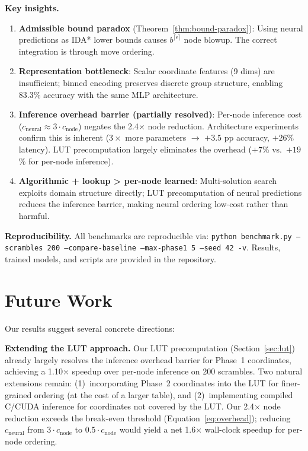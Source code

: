 \documentclass[conference]{IEEEtran}
\begin{document}
\textbf{Key insights.}
\begin{enumerate}[leftmargin=*]
  \item \textbf{Admissible bound paradox} (Theorem~\ref{thm:bound-paradox}): Using neural predictions as IDA* lower bounds causes $b^{\lceil\epsilon\rceil}$ node blowup. The correct integration is through move ordering.
  \item \textbf{Representation bottleneck}: Scalar coordinate features (9 dims) are insufficient; binned encoding preserves discrete group structure, enabling 83.3\% accuracy with the same MLP architecture.
  \item \textbf{Inference overhead barrier (partially resolved)}: Per-node inference cost ($c_{\text{neural}} \approx 3 \cdot c_{\text{node}}$) negates the 2.4$\times$ node reduction. Architecture experiments confirm this is inherent ($3{\times}$ more parameters $\to$ $+3.5$ pp accuracy, $+26$\% latency). LUT precomputation largely eliminates the overhead ($+7$\% vs.\ $+19$\% for per-node inference).
  \item \textbf{Algorithmic + lookup > per-node learned}: Multi-solution search exploits domain structure directly; LUT precomputation of neural predictions reduces the inference barrier, making neural ordering low-cost rather than harmful.
\end{enumerate}

\textbf{Reproducibility.} All benchmarks are reproducible via: \texttt{python benchmark.py --scrambles 200 --compare-baseline --max-phase1 5 --seed 42 -v}. Results, trained models, and scripts are provided in the repository.

\section{Future Work}
\label{sec:future}

Our results suggest several concrete directions:

\textbf{Extending the LUT approach.}
Our LUT precomputation (Section~\ref{sec:lut}) already largely resolves the inference overhead barrier for Phase~1 coordinates, achieving a 1.10$\times$ speedup over per-node inference on 200 scrambles. Two natural extensions remain: (1)~incorporating Phase~2 coordinates into the LUT for finer-grained ordering (at the cost of a larger table), and (2)~implementing compiled C/CUDA inference for coordinates not covered by the LUT. Our 2.4$\times$ node reduction exceeds the break-even threshold (Equation~\ref{eq:overhead}); reducing $c_{\text{neural}}$ from $3 \cdot c_{\text{node}}$ to $0.5 \cdot c_{\text{node}}$ would yield a net 1.6$\times$ wall-clock speedup for per-node ordering.
\end{document}
